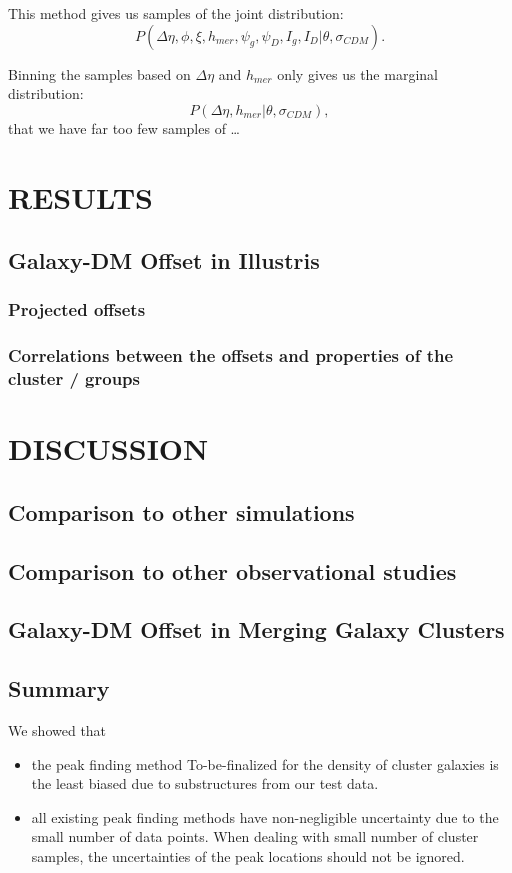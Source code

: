 \documentclass[letterpaper,useAMS,usenatbib]{mn2e}
\begin{document}
This method gives us samples of the joint distribution: 
\begin{equation}
	P(\Delta \eta, \phi, \xi, h_{mer}, \psi_g, \psi_D, I_g, I_D | \theta,
	\sigma_{CDM}). 
\end{equation}


Binning the samples based on $\Delta \eta$ and $h_{mer}$ only gives us the
marginal distribution:
\begin{equation}
	P(\Delta \eta, h_{mer} | \theta, \sigma_{CDM}),
\end{equation}
that we have far too few samples of \dots


\section{RESULTS} 

\subsection{Galaxy-DM Offset in Illustris}
\subsubsection{Projected offsets}
\subsubsection{Correlations between the offsets and properties of the cluster / groups}
\section{DISCUSSION}
\subsection{Comparison to other simulations}
\subsection{Comparison to other observational studies}
\subsection{Galaxy-DM Offset in Merging Galaxy Clusters}
\subsection{Summary}
We showed that 
\begin{itemize}
		\item  the peak finding method To-be-finalized for the density of cluster
			galaxies is the least biased due to substructures from our test data. 
		\item  all existing peak finding methods have non-negligible uncertainty 
			due to the small number of data points. When dealing with small number of
			cluster samples, the uncertainties of the peak locations should not be
			ignored.
\end{itemize}
\end{document}
